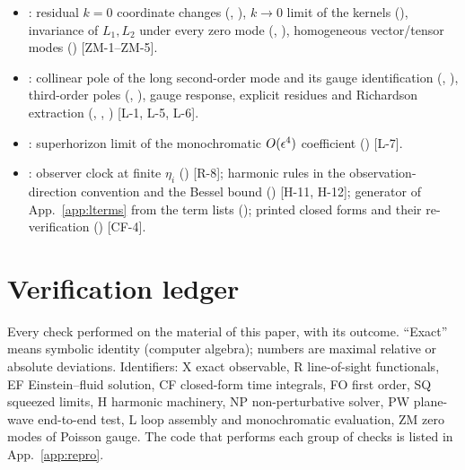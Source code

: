 \begin{itemize}
, ) [L-4].
\item {}: residual $k=0$ coordinate changes (, ), $k\to0$ limit of the kernels (),
invariance of $L_1,L_2$ under every zero mode (, ), homogeneous vector/tensor modes () [ZM-1--ZM-5].
\item {}: collinear pole of the long second-order mode and its gauge identification (, ), third-order
poles (, ), gauge response, explicit residues and Richardson extraction (,
, ) [L-1, L-5, L-6].
\item {}: superhorizon limit of the monochromatic $O(\epsilon^4)$ coefficient () [L-7].
\item {}: observer clock at finite $\eta_i$ () [R-8]; harmonic rules in the observation-direction convention
and the Bessel bound () [H-11, H-12]; generator of App.~\ref{app:lterms} from the term lists ();
printed closed forms and their re-verification () [CF-4].
\end{itemize}
\endgroup

\section{Verification ledger}
\label{app:ledger}
\begingroup\sloppy
Every check performed on the material of this paper, with its outcome.  ``Exact'' means symbolic identity (computer algebra);
numbers are maximal relative or absolute deviations.  Identifiers: X exact observable, R line-of-sight functionals, EF Einstein--fluid
solution, CF closed-form time integrals, FO first order, SQ squeezed limits, H harmonic machinery, NP non-perturbative solver, PW
plane-wave end-to-end test, L loop assembly and monochromatic evaluation, ZM zero modes of Poisson gauge.  The code that performs each group of checks is listed in App.~\ref{app:repro}.\par\endgroup

